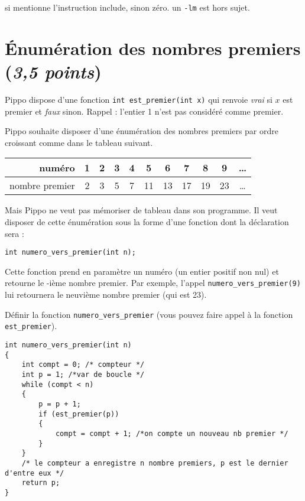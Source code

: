 \begin{baremeenv}
   si mentionne l'instruction include, sinon zéro. un
  \verb+-lm+ est hors sujet.
\end{baremeenv}

\section{Énumération des nombres premiers (\emph{3,5 points})}
Pippo dispose d'une fonction \verb+int est_premier(int x)+ qui renvoie
\emph{vrai} si $x$ est premier et \emph{faux} sinon. Rappel : l'entier 1 n'est
pas considéré comme premier. 

Pippo souhaite disposer d'une énumération des nombres premiers par
ordre croissant comme dans le tableau suivant. 

\begin{center}
\begin{tabular}{|r|c|c|c|c|c|c|c|c|c|c }
\hline
numéro              & 1 & 2 & 3 & 4 & 5   & 6   &   7 &   8 &  9  &
\ldots \\ \hline
nombre premier & 2 & 3 & 5 & 7 & 11 & 13 & 17 & 19 & 23 & \ldots \\ \hline
\end{tabular}
\end{center}


Mais Pippo ne veut pas mémoriser de tableau dans son programme. Il veut
disposer de cette énumération sous la forme d'une fonction dont la
déclaration sera :
\begin{center}
  \verb+int numero_vers_premier(int n);+
\end{center}
\noindent Cette fonction prend en paramètre un numéro  (un entier positif non nul) et
retourne le -ième nombre premier. Par exemple, l'appel
\verb+numero_vers_premier(9)+ lui retournera le neuvième nombre premier
(qui est 23).


\question Définir la fonction \verb+numero_vers_premier+ (vous pouvez faire
appel à la fonction
\verb+est_premier+).

\begin{correction}
\begin{small}
\begin{verbatim}
int numero_vers_premier(int n)
{
    int compt = 0; /* compteur */
    int p = 1; /*var de boucle */
    while (compt < n)
    {
        p = p + 1;
        if (est_premier(p))
        {
            compt = compt + 1; /*on compte un nouveau nb premier */
        }
    }
    /* le compteur a enregistre n nombre premiers, p est le dernier d'entre eux */
    return p;
}
\end{verbatim}
\end{small}
\end{correction}


